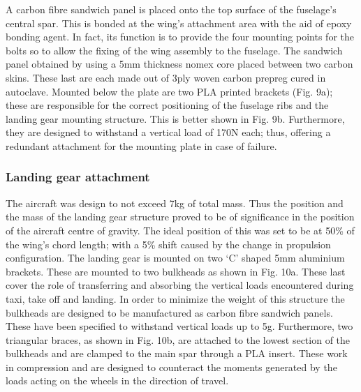 \documentclass[../../main.tex]{subfiles}
\begin{document}
A carbon fibre sandwich panel is placed onto the top surface of the fuselage’s central spar.
This is bonded at the wing’s attachment area with the aid of epoxy bonding agent.
In fact, its function is to provide the four mounting points for the bolts so to allow the fixing of the wing assembly to the fuselage.
The sandwich panel obtained by using a 5mm thickness nomex core placed between two carbon skins.
These last are each made out of 3ply woven carbon prepreg cured in autoclave.
Mounted below the plate are two PLA printed brackets (Fig. 9a); these are responsible for the correct positioning of the fuselage ribs and the landing gear mounting structure.
This is better shown in Fig. 9b.
Furthermore, they are designed to withstand a vertical load of 170N each; thus, offering a redundant attachment for the mounting plate in case of failure.


\subsubsection{Landing gear attachment} \label{sec:design-process:final-design-proposal:fuselage:landing-gear-attachment}

The aircraft was design to not exceed 7kg of total mass.
Thus the position and the mass of the landing gear structure proved to be of significance in the position of the aircraft centre of gravity.
The ideal position of this was set to be at 50\% of the wing’s chord length; with a 5\% shift caused by the change in propulsion configuration.
The landing gear is mounted on two ‘C’ shaped 5mm aluminium brackets.
These are mounted to two bulkheads as shown in Fig. 10a.
These last cover the role of transferring and absorbing the vertical loads encountered during taxi, take off and landing.
In order to minimize the weight of this structure the bulkheads are designed to be manufactured as carbon fibre sandwich panels.
These have been specified to withstand vertical loads up to 5g.
Furthermore, two triangular braces, as shown in Fig. 10b, are attached to the lowest section of the bulkheads and are clamped to the main spar through a PLA insert.
These work in compression and are designed to counteract the moments generated by the loads acting on the wheels in the direction of travel. 

\end{document}
